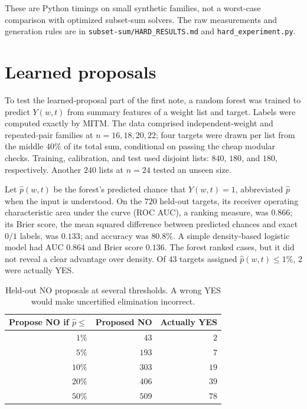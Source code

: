 \documentclass[10pt,english]{article}
\begin{document}
These are Python timings on small synthetic families, not a worst-case comparison with optimized subset-sum solvers. The raw measurements and generation rules are in \texttt{subset-sum/HARD\_RESULTS.md} and \texttt{hard\_experiment.py}.

\section{Learned proposals}
To test the learned-proposal part of the first note, a random forest was trained to predict \(Y(w,t)\) from summary features of a weight list and target. Labels were computed exactly by MITM. The data comprised independent-weight and repeated-pair families at \(n=16,18,20,22\); four targets were drawn per list from the middle \(40\%\) of its total sum, conditional on passing the cheap modular checks. Training, calibration, and test used disjoint lists: \(840\), \(180\), and \(180\), respectively. Another \(240\) lists at \(n=24\) tested an unseen size.

Let \(\widehat p(w,t)\) be the forest's predicted chance that \(Y(w,t)=1\),
abbreviated \(\widehat p\) when the input is understood.
On the \(720\) held-out targets, its receiver operating characteristic
area under the curve (ROC AUC), a ranking measure, was \(0.866\); its
Brier score, the mean squared difference between predicted chances and
exact \(0/1\) labels, was \(0.133\); and accuracy was \(80.8\%\). A simple
density-based logistic model had AUC \(0.864\) and Brier score \(0.136\).
The forest ranked cases, but it did not reveal a clear advantage over
density. Of \(43\) targets assigned \(\widehat p(w,t)\le 1\%\), \(2\) were
actually YES.

\begin{table}[h]
\centering
\caption{Held-out NO proposals at several thresholds. A wrong YES would make uncertified elimination incorrect.}
\small
\begin{tabular}{rrr}
\toprule
Propose NO if \(\widehat p\le\) & Proposed NO & Actually YES\\
\midrule
\(1\%\) & \(43\) & \(2\)\\
\(5\%\) & \(193\) & \(7\)\\
\(10\%\) & \(303\) & \(19\)\\
\(20\%\) & \(406\) & \(39\)\\
\(50\%\) & \(509\) & \(78\)\\
\bottomrule
\end{tabular}
\end{table}
\end{document}
